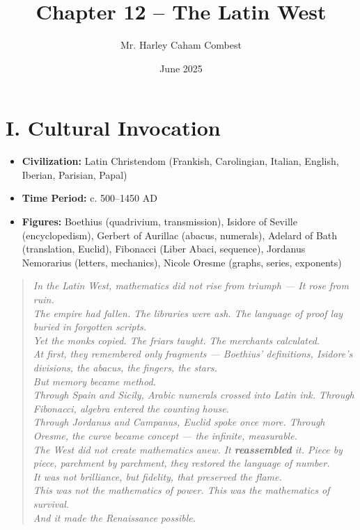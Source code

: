 \documentclass[9pt]{article}
\title{Chapter 12 -- The Latin West}
\author{Mr. Harley Caham Combest}
\date{June 2025}
\begin{document}
\maketitle

\section*{I. Cultural Invocation}

\begin{itemize}
    \item \textbf{Civilization:} Latin Christendom (Frankish, Carolingian, Italian, English, Iberian, Parisian, Papal)
    \item \textbf{Time Period:} c. 500--1450 AD
    \item \textbf{Figures:} 
    Boethius (quadrivium, transmission),  
    Isidore of Seville (encyclopedism),  
    Gerbert of Aurillac (abacus, numerals),  
    Adelard of Bath (translation, Euclid),  
    Fibonacci (Liber Abaci, sequence),  
    Jordanus Nemorarius (letters, mechanics),  
    Nicole Oresme (graphs, series, exponents)
\end{itemize}

\begin{quote}
\itshape
In the Latin West, mathematics did not rise from triumph —  
It rose from ruin. \\
The empire had fallen. The libraries were ash. The language of proof lay buried in forgotten scripts. \\
Yet the monks copied. The friars taught. The merchants calculated.\\
At first, they remembered only fragments — Boethius’ definitions, Isidore’s divisions, the abacus, the fingers, the stars.\\
But memory became method.\\
Through Spain and Sicily, Arabic numerals crossed into Latin ink.  
Through Fibonacci, algebra entered the counting house.\\
Through Jordanus and Campanus, Euclid spoke once more.  
Through Oresme, the curve became concept — the infinite, measurable.\\
The West did not create mathematics anew.  
It \textbf{reassembled} it.  
Piece by piece, parchment by parchment, they restored the language of number.\\
It was not brilliance, but \textit{fidelity}, that preserved the flame.\\
This was not the mathematics of power.  
This was the mathematics of survival.\\
And it made the Renaissance possible.
\end{quote}
\end{document}
